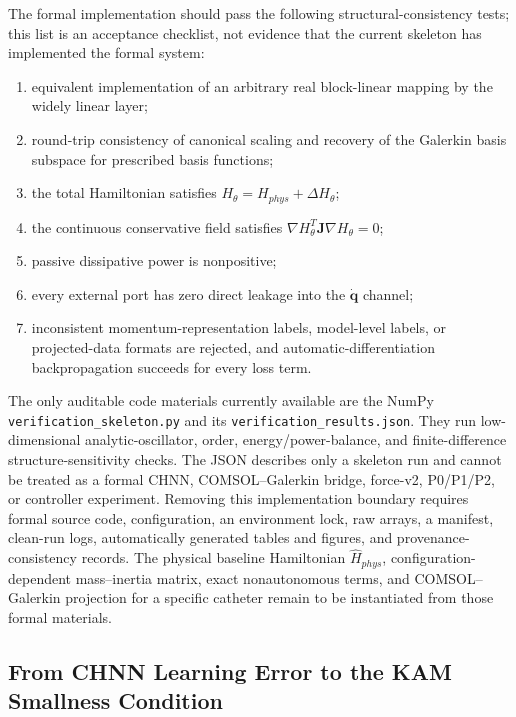 The formal implementation should pass the following structural-consistency tests; this list is an acceptance checklist, not evidence that the current skeleton has implemented the formal system:

\begin{enumerate}
\def\labelenumi{\arabic{enumi}.}
\tightlist
\item
  equivalent implementation of an arbitrary real block-linear mapping by the widely linear layer;
\item
  round-trip consistency of canonical scaling and recovery of the Galerkin basis subspace for prescribed basis functions;
\item
  the total Hamiltonian satisfies \(H_{\theta}=H_{phys}+\Delta H_{\theta}\);
\item
  the continuous conservative field satisfies \(\nabla H_{\theta}^{T}\mathbf{J}\nabla H_{\theta}=0\);
\item
  passive dissipative power is nonpositive;
\item
  every external port has zero direct leakage into the \(\dot{\mathbf{q}}\) channel;
\item
  inconsistent momentum-representation labels, model-level labels, or projected-data formats are rejected, and automatic-differentiation backpropagation succeeds for every loss term.
\end{enumerate}

\begin{sloppypar}
The only auditable code materials currently available are the NumPy \texttt{verification\_skeleton.py} and its \texttt{verification\_results.json}. They run low-dimensional analytic-oscillator, order, energy/power-balance, and finite-difference structure-sensitivity checks. The JSON describes only a skeleton run and cannot be treated as a formal CHNN, COMSOL--Galerkin bridge, force-v2, P0/P1/P2, or controller experiment. Removing this implementation boundary requires formal source code, configuration, an environment lock, raw arrays, a manifest, clean-run logs, automatically generated tables and figures, and provenance-consistency records. The physical baseline Hamiltonian \({\widehat{H}}_{phys}\), configuration-dependent mass--inertia matrix, exact nonautonomous terms, and COMSOL--Galerkin projection for a specific catheter remain to be instantiated from those formal materials.
\end{sloppypar}

\subsection{From CHNN Learning Error to the KAM Smallness Condition}\label{sec:chnn-4-6}

